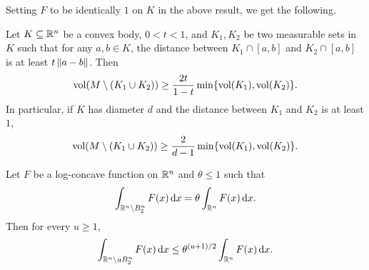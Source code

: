 Setting $F$ to be identically $1$ on $K$ in the above result, we get the following.

\begin{corollary}
	Let $K\subseteq\mathbb{R}^n$ be a convex body, $0<t<1$, and $K_1,K_2$ be two measurable sets in $K$ such that for any $a,b\in K$, the distance between $K_1\cap[a,b]$ and $K_2\cap[a,b]$ is at least $t\left\lVert a-b\right\rVert$. Then
	\[ \operatorname{vol}(M\setminus(K_1\cup K_2)) \geq \frac{2t}{1-t} \min\{\operatorname{vol}(K_1),\operatorname{vol}(K_2)\}. \]
	In particular, if $K$ has diameter $d$ and the distance between $K_1$ and $K_2$ is at least $1$,
	\[ \operatorname{vol}(M\setminus(K_1\cup K_2)) \geq \frac{2}{d-1} \min\{\operatorname{vol}(K_1),\operatorname{vol}(K_2)\}. \]
\end{corollary}

\begin{theorem}
	\label{inequality integral setminus ball}
	Let $F$ be a log-concave function on $\mathbb{R}^n$ and $\theta\leq 1$ such that
	\[ \int_{\mathbb{R}^n \setminus B_2^n} F(x)\operatorname{d}\!{x} = \theta \int_{\mathbb{R}^n} F(x)\operatorname{d}\!{x}. \]
	Then for every $u\geq 1$,
	\[ \int_{\mathbb{R}^n \setminus uB_2^n} F(x)\operatorname{d}\!{x} \leq \theta^{(u+1)/2} \int_{\mathbb{R}^n} F(x)\operatorname{d}\!{x}. \]
\end{theorem}
